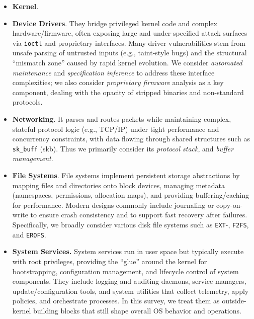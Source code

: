 \begin{itemize}
  \item 
  \textbf{Kernel}.


  \item 
  \textbf{Device Drivers}.
  They bridge privileged kernel code and complex hardware/firmware, often exposing large and under-specified attack surfaces via \texttt{ioctl} and proprietary interfaces.
  Many driver vulnerabilities stem from unsafe parsing of untrusted inputs (e.g., taint-style bugs) and the structural ``mismatch zone'' caused by rapid kernel evolution.
  We consider \textit{automated maintenance} and \textit{specification inference} to address these interface complexities;
  we also consider \textit{proprietary firmware} analysis as a key component, dealing with the opacity of stripped binaries and non-standard protocols.
  

  \item 
  \textbf{Networking}.
  It parses and routes packets while maintaining complex, stateful protocol logic (e.g., TCP/IP) under tight performance and concurrency constraints, with data flowing through shared structures such as \texttt{sk\_buff} (skb).
  Thus we primarily consider its \textit{protocol stack}, and \textit{buffer management}.  


  \item 
  \textbf{File Systems}.
  File systems implement persistent storage abstractions by mapping files and directories onto block devices, managing metadata (namespaces, permissions, allocation maps), and providing buffering/caching for performance.
  Modern designs commonly include journaling or copy-on-write to ensure crash consistency and to support fast recovery after failures.
  Specifically, we broadly consider various disk file systems such as \texttt{EXT}-, \texttt{F2FS}, and \texttt{EROFS}.

  \item 
  \textbf{System Services.}
  System services run in user space but typically execute with root privileges, providing the ``glue'' around the kernel for bootstrapping, configuration management, and lifecycle control of system components.
  They include logging and auditing daemons, service managers, update/configuration tools, and system utilities that collect telemetry, apply policies, and orchestrate processes.
  In this survey, we treat them as outside-kernel building blocks that still shape overall OS behavior and operations.


\end{itemize}
